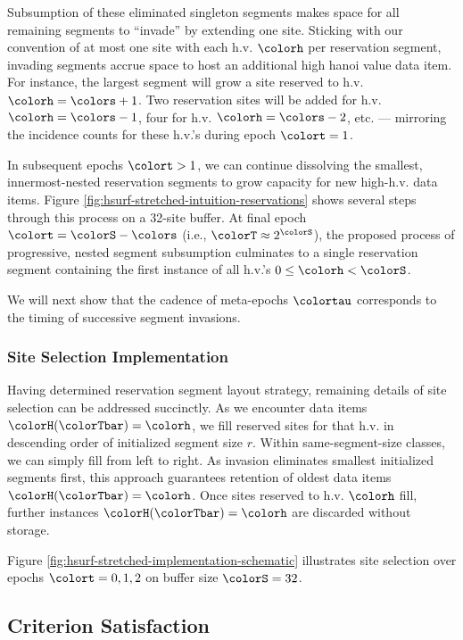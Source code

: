 Subsumption of these eliminated singleton segments makes space for all remaining segments to ``invade'' by extending one site.
Sticking with our convention of at most one site with each h.v. $\colorh$ per reservation segment, invading segments accrue space to host an additional high hanoi value data item.
For instance, the largest segment will grow a site reserved to h.v. $\colorh=\colors +1$.
Two reservation sites will be added for h.v. $\colorh=\colors - 1$, four for h.v. $\colorh=\colors - 2$, etc. --- mirroring the incidence counts for these h.v.'s during epoch $\colort=1$.

In subsequent epochs $\colort>1$, we can continue dissolving the smallest, innermost-nested reservation segments to grow capacity for new high-h.v. data items.
Figure \ref{fig:hsurf-stretched-intuition-reservations} shows several steps through this process on a 32-site buffer.
At final epoch $\colort=\colorS-\colors$ (i.e., $\colorT \approx 2^{\colorS}$), the proposed process of progressive, nested segment subsumption culminates to a single reservation segment containing the first instance of all h.v.'s $0 \leq \colorh < \colorS$.

We will next show that the cadence of meta-epochs $\colortau$ corresponds to the timing of successive segment invasions.



\subsubsection{Site Selection Implementation}

Having determined reservation segment layout strategy, remaining details of site selection can be addressed succinctly.
As we encounter data items $\colorH(\colorTbar) = \colorh$, we fill reserved sites for that h.v. in descending order of initialized segment size $r$.
Within same-segment-size classes, we can simply fill from left to right.
As invasion eliminates smallest initialized segments first, this approach guarantees retention of oldest data items $\colorH(\colorTbar) = \colorh$.
Once sites reserved to h.v. $\colorh$ fill, further instances $\colorH(\colorTbar) = \colorh$ are discarded without storage.

Figure \ref{fig:hsurf-stretched-implementation-schematic} illustrates site selection over epochs $\colort=0,1,2$ on buffer size $\colorS=32$.

\subsection{Criterion Satisfaction}

